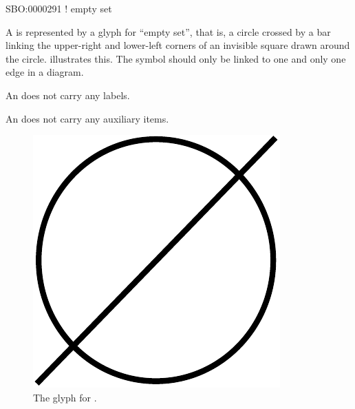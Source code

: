 \begin{glyphDescription}

\glyphSboTerm SBO:0000291 ! empty set

\glyphContainer A  is represented by a glyph for ``empty
set'', that is, a circle crossed by a bar linking the upper-right and
lower-left corners of an invisible square drawn around the circle.
 illustrates this.  The symbol should only be linked to one
and only one edge in a diagram.

\glyphLabel An  does not carry any labels.

\glyphAux An  does not carry any auxiliary items.  

\end{glyphDescription}

\begin{figure}[H]
  \centering
  \includegraphics[scale = 0.3]{images/sourceSink}
  \caption{The \PD glyph for .}
  \label{fig:sourceSink}
\end{figure}






